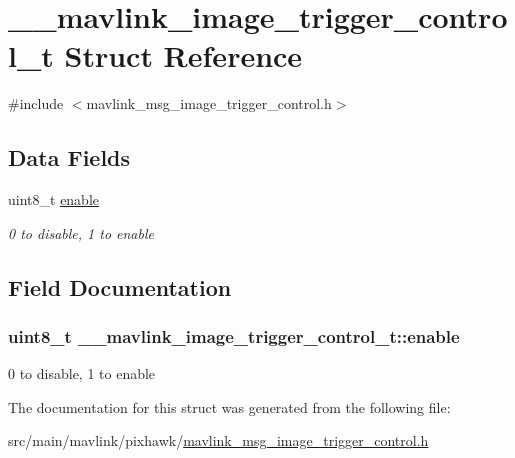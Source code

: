 \hypertarget{struct____mavlink__image__trigger__control__t}{\section{\+\_\+\+\_\+mavlink\+\_\+image\+\_\+trigger\+\_\+control\+\_\+t Struct Reference}
\label{struct____mavlink__image__trigger__control__t}
}


{\ttfamily \#include $<$mavlink\+\_\+msg\+\_\+image\+\_\+trigger\+\_\+control.\+h$>$}

\subsection*{Data Fields}
\begin{DoxyCompactItemize}
\item 
uint8\+\_\+t \hyperlink{struct____mavlink__image__trigger__control__t_a0df586d0f681e3559c6823307555c1d4}{enable}
\begin{DoxyCompactList}\small\item\em 0 to disable, 1 to enable \end{DoxyCompactList}\end{DoxyCompactItemize}


\subsection{Field Documentation}
\hypertarget{struct____mavlink__image__trigger__control__t_a0df586d0f681e3559c6823307555c1d4}{
\subsubsection[{enable}]{\setlength{\rightskip}{0pt plus 5cm}uint8\+\_\+t \+\_\+\+\_\+mavlink\+\_\+image\+\_\+trigger\+\_\+control\+\_\+t\+::enable}}\label{struct____mavlink__image__trigger__control__t_a0df586d0f681e3559c6823307555c1d4}


0 to disable, 1 to enable 



The documentation for this struct was generated from the following file\+:\begin{DoxyCompactItemize}
\item 
src/main/mavlink/pixhawk/\hyperlink{mavlink__msg__image__trigger__control_8h}{mavlink\+\_\+msg\+\_\+image\+\_\+trigger\+\_\+control.\+h}\end{DoxyCompactItemize}
